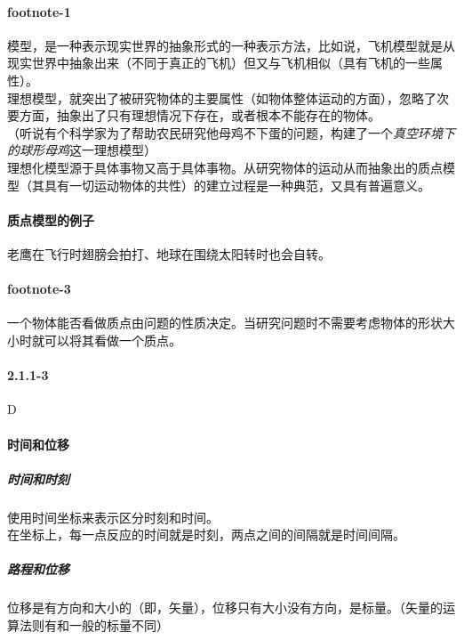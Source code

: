 \documentclass{ctexart}
\begin{document}
	\paragraph{footnote-1}
	模型，是一种表示现实世界的抽象形式的一种表示方法，比如说，飞机模型就是从现实世界中抽象出来（不同于真正的飞机）但又与飞机相似（具有飞机的一些属性）。\\
	理想模型，就突出了被研究物体的主要属性（如物体整体运动的方面），忽略了次要方面，抽象出了只有理想情况下存在，或者根本不能存在的物体。\\
	（听说有个科学家为了帮助农民研究他母鸡不下蛋的问题，构建了一个\emph{真空环境下的球形母鸡}这一理想模型）\\
	理想化模型源于具体事物又高于具体事物。从研究物体的运动从而抽象出的质点模型（其具有一切运动物体的共性）的建立过程是一种典范，又具有普遍意义。

	\paragraph{质点模型的例子}
	老鹰在飞行时翅膀会拍打、地球在围绕太阳转时也会自转。

	\paragraph{footnote-3}
	一个物体能否看做质点由问题的性质决定。当研究问题时不需要考虑物体的形状大小时就可以将其看做一个质点。

	\paragraph{2.1.1-3}
	D

	\paragraph{时间和位移}
		\subparagraph{时间和时刻}
			使用时间坐标来表示区分时刻和时间。\\
			在坐标上，每一点反应的时间就是时刻，两点之间的间隔就是时间间隔。
		\subparagraph{路程和位移}
			位移是有方向和大小的（即，矢量），位移只有大小没有方向，是标量。（矢量的运算法则有和一般的标量不同）
\end{document}

